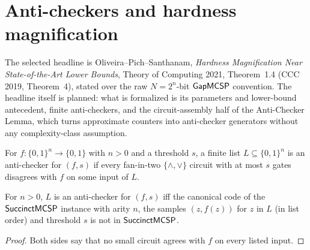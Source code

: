 \section{Anti-checkers and hardness magnification}

The selected headline is Oliveira--Pich--Santhanam, \emph{Hardness
Magnification Near State-of-the-Art Lower Bounds}, Theory of Computing 2021,
Theorem~1.4 (CCC 2019, Theorem~4), stated over the raw $N = 2^n$-bit
$\mathsf{GapMCSP}$ convention. The headline itself is planned: what is formalized
is its parameters and lower-bound antecedent, finite anti-checkers, and the
circuit-assembly half of the Anti-Checker Lemma, which turns approximate
counters into anti-checker generators without any complexity-class
assumption.

\begin{definition}
  \label{def:meta-antichecker}
  \leanok
  For $f \colon \{0,1\}^n \to \{0,1\}$ with $n > 0$ and a threshold $s$, a
  finite list $L \subseteq \{0,1\}^n$ is an anti-checker for $(f, s)$ if every
  fan-in-two $\{\wedge,\vee\}$ circuit with at most $s$ gates disagrees with $f$
  on some input of $L$.
\end{definition}

\begin{theorem}
  \label{thm:meta-antichecker-succinct}
  \leanok
  For $n > 0$, $L$ is an anti-checker for $(f, s)$ iff the canonical code of
  the $\mathsf{SuccinctMCSP}$ instance with arity $n$, the samples $(z, f(z))$ for
  $z$ in $L$ (in list order) and threshold $s$ is not in $\mathsf{SuccinctMCSP}$.
\end{theorem}
\begin{proof}
  \leanok
  Both sides say that no small circuit agrees with $f$ on every listed input.
\end{proof}

